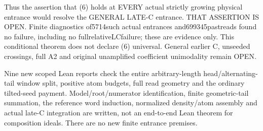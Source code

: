 Thus the assertion that (6) holds at EVERY actual strictly growing
physical entrance would resolve the GENERAL LATE-C entrance.
THAT ASSERTION IS OPEN. Finite diagnostics of5714such actual entrances
and699345pastreads found no failure, including no fullrelativeLCfailure;
these are evidence only. This conditional theorem does not declare
(6) universal. General earlier C, unseeded crossings, full A2 and
original unamplified coefficient unimodality remain OPEN.

Nine new scoped Lean reports check the entire arbitrary-length
head/alternating-tail window split, positive atom budgets, full
read geometry and the ordinary tilted-seed payment.
Model/root/numerator identification, finite geometric-tail summation,
the reference word induction, normalized density/atom assembly and
actual late-C integration are written, not an end-to-end Lean theorem
for composition ideals. There are no new finite entrance premises.

